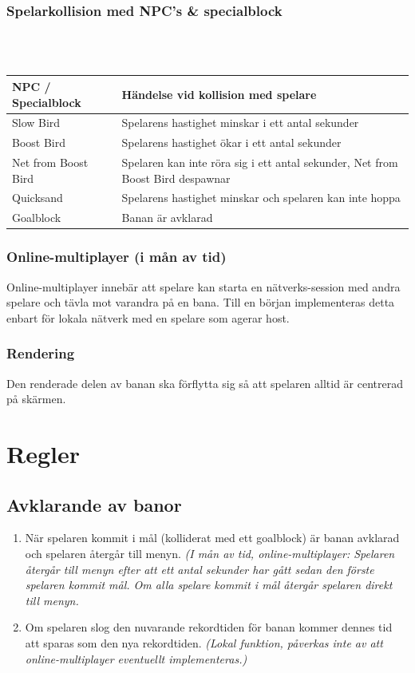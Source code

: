 \documentclass{TDP003mall}
\begin{document}
\subsubsection{Spelarkollision med NPC's \& specialblock}
\\\\
\begin{tabular}{|l|l|}
\hline
\textbf{NPC / Specialblock} & \textbf{Händelse vid kollision med spelare}\\\hline
Slow Bird & Spelarens hastighet minskar i ett antal sekunder\\\hline
Boost Bird & Spelarens hastighet ökar i ett antal sekunder\\\hline
Net from Boost Bird & Spelaren kan inte röra sig i ett antal sekunder, Net from Boost Bird despawnar\\\hline
Quicksand & Spelarens hastighet minskar och spelaren kan inte hoppa \\\hline
Goalblock & Banan är avklarad \\\hline
\end{tabular}

\subsubsection{Online-multiplayer (i mån av tid)}
Online-multiplayer innebär att spelare kan starta en nätverks-session med andra spelare och tävla mot varandra på en bana. Till en början implementeras detta enbart för lokala nätverk med en spelare som agerar host. 

\subsubsection{Rendering}
Den renderade delen av banan ska förflytta sig så att spelaren alltid är centrerad på skärmen.

\newpage

\section{Regler}

\subsection{Avklarande av banor}
\begin{enumerate}
\item När spelaren kommit i mål (kolliderat med ett goalblock) är banan avklarad och spelaren återgår till menyn. \textit{(I mån av tid, online-multiplayer: Spelaren återgår till menyn efter att ett antal sekunder har gått sedan den förste spelaren kommit mål. Om alla spelare kommit i mål återgår spelaren direkt till menyn.}
\item Om spelaren slog den nuvarande rekordtiden för banan kommer dennes tid att sparas som den nya rekordtiden. \textit{(Lokal funktion, påverkas inte av att online-multiplayer eventuellt implementeras.)}
\end{enumerate}
\end{document}
